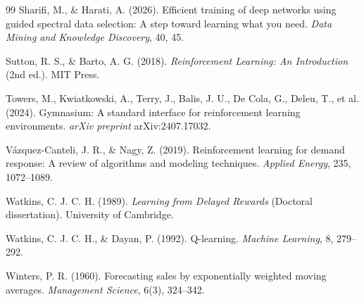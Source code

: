 \documentclass[11pt,a4paper]{article}
\begin{document}
\begin{thebibliography}{99}
 Sharifi, M., \& Harati, A. (2026). Efficient training of deep networks using guided spectral data selection: A step toward learning what you need. \emph{Data Mining and Knowledge Discovery}, 40, 45.

 Sutton, R. S., \& Barto, A. G. (2018). \emph{Reinforcement Learning: An Introduction} (2nd ed.). MIT Press.

 Towers, M., Kwiatkowski, A., Terry, J., Balis, J. U., De Cola, G., Deleu, T., et al. (2024). Gymnasium: A standard interface for reinforcement learning environments. \emph{arXiv preprint} arXiv:2407.17032.

 V\'{a}zquez-Canteli, J. R., \& Nagy, Z. (2019). Reinforcement learning for demand response: A review of algorithms and modeling techniques. \emph{Applied Energy}, 235, 1072--1089.

 Watkins, C. J. C. H. (1989). \emph{Learning from Delayed Rewards} (Doctoral dissertation). University of Cambridge.

 Watkins, C. J. C. H., \& Dayan, P. (1992). Q-learning. \emph{Machine Learning}, 8, 279--292.

 Winters, P. R. (1960). Forecasting sales by exponentially weighted moving averages. \emph{Management Science}, 6(3), 324--342.

\end{thebibliography}
\endgroup
\end{document}
